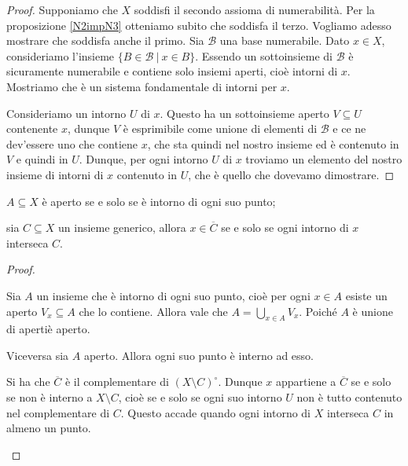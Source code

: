 \documentclass{article}
\begin{document}
\begin{proof}
	Supponiamo che $X$ soddisfi il secondo assioma di numerabilità. Per la
	proposizione \ref{N2impN3} otteniamo subito che soddisfa il terzo. Vogliamo
	adesso mostrare che soddisfa anche il primo. Sia $\mathcal{B}$ una base
	numerabile. Dato $x \in X$, consideriamo l'insieme ${\{ B \in \mathcal{B}\
	|\ x \in B \}}$. Essendo un sottoinsieme di $\mathcal{B}$ è sicuramente
	numerabile e contiene solo insiemi aperti, cioè intorni di $x$. Mostriamo
	che è un sistema fondamentale di intorni per $x$.

	Consideriamo un intorno $U$ di $x$. Questo ha un sottoinsieme aperto $V
	\subseteq U$ contenente $x$, dunque $V$ è esprimibile come unione di
	elementi di $\mathcal{B}$ e ce ne dev'essere uno che contiene $x$, che sta
	quindi nel nostro insieme ed è contenuto in $V$ e quindi in $U$. Dunque, per
	ogni intorno $U$ di $x$ troviamo un elemento del nostro insieme di intorni
	di $x$ contenuto in $U$, che è quello che dovevamo dimostrare.
\end{proof}

\begin{prop}
	\begin{nlist}
		\item $A \subseteq X$ è aperto se e solo se è intorno di ogni suo punto;
		\item sia $C \subseteq X$ un insieme generico, allora $x \in
		\overline{C}$ se e solo se ogni intorno di $x$ interseca $C$.
	\end{nlist}
\end{prop}

\begin{proof}
\begin{nlist}
\item Sia $A$ un insieme che \`e intorno di ogni suo punto, cio\`e per ogni $x
\in A$ esiste un aperto $V_x \subseteq A$ che lo contiene. Allora vale che
$\displaystyle A = \bigcup_{x \in A} V_x$. Poiché $A$ \`e unione di aperti\`e
aperto.

Viceversa sia $A$ aperto. Allora ogni suo punto \`e interno ad esso.

\item Si ha che $\overline{C}$ \`e il complementare di $(X\setminus C)^\circ$.
Dunque $x$ appartiene a $\overline{C}$ se e solo se non \`e interno a $X
\setminus C$, cioè se e solo se ogni suo intorno $U$ non \`e tutto contenuto nel
complementare di $C$. Questo accade quando ogni intorno di $X$ interseca $C$ in
almeno un punto.

\end{nlist}
\end{proof}
\end{document}
